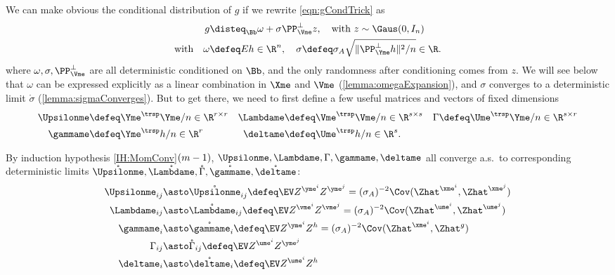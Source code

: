\documentclass[main.tex]{subfiles}
\begin{document}
We can make obvious the conditional distribution of $g$ if we rewrite \cref{eqn:gCondTrick} as
\begin{align}
  g &\disteq_\Bb \omega + \sigma \PP_{\Vme}^\perp z,\quad \text{with $z \sim \Gaus(0, I_n)$}
  \label{eqn:gConditionedOnB}
  \\
  \text{with}\quad
  \omega
  &\defeq
      E h \in \R^n,
      \quad
  \sigma \defeq
    \sigma_A
  \sqrt{\|\PP_{\Yme}^\perp h\|^2/n} \in \R
  .
  \label{eqn:meanvardef}
\end{align}
where $\omega, \sigma, \PP_\Vme^\perp$ are all deterministic conditioned on $\Bb$, and the only randomness after conditioning comes from $z$.
We will see below that $\omega$ can be expressed explicitly as a linear combination in $\Xme$ and $\Vme$ (\cref{lemma:omegaExpansion}), and $\sigma$ converges to a deterministic limit $\mathring\sigma$ (\cref{lemma:sigmaConverges}).
But to get there, we need to first define a few useful matrices and vectors of fixed dimensions
\begin{equation}
\begin{aligned}
    \Upsilonme 
        &\defeq
            \Yme^\trsp \Yme/n \in \R^{r \times r}
            &
    \Lambdame 
        &\defeq
            \Vme^\trsp \Vme/n \in \R^{s \times s}
            &
    \Gamma
        &\defeq
            \Ume^\trsp \Yme/n \in \R^{s \times r}
            \\
    \gammame
        &\defeq
            \Yme^\trsp h/n \in \R^{r}
            &
    \deltame
        &\defeq
            \Ume^\trsp h /n \in \R^s
            .
\end{aligned}
    \label{eqn:momentMatrices}
\end{equation}

By induction hypothesis \ref{IH:MomConv}$(m-1)$, $\Upsilonme , \Lambdame , \Gamma, \gammame, \deltame$ all converge a.s.\ to corresponding deterministic limits $\mathring{\Upsilonme }, \mathring{\Lambdame }, \mathring \Gamma, \mathring{\gammame}, \mathring{\deltame}$:
\begin{equation}
\begin{aligned}
  \Upsilonme_{ij}
    &\asto
      \mathring{\Upsilonme }_{ij}
    \defeq
      \EV  Z^{\yme^i}  Z^{\yme^j}
    =
      (\sigma_A)^{-2} 
      \Cov(\Zhat^{\xme^i}, \Zhat^{\xme^j})
      \\
    \Lambdame_{ij}
      &\asto
        \mathring{\Lambdame }_{ij}
      \defeq
        \EV  Z^{\vme^i}  Z^{\vme^j}
      =
        (\sigma_A)^{-2} \Cov(\Zhat^{\ume^{i}}, \Zhat^{\ume^{j}})
      \\
  \gammame_i
    &\asto
      \mathring{\gammame}_i
    \defeq
      \EV  Z^{\yme^i} Z^h
    =
      (\sigma_A)^{-2} \Cov(\Zhat^{\xme^i}, \Zhat^{g})
      \\
  \Gamma_{ij}
    &\asto
      \mathring \Gamma_{ij}
    \defeq
      \EV  Z^{\ume^i} Z^{\yme^j}
      \\
  \deltame_i
    &\asto
      \mathring{\deltame}_i
    \defeq
      \EV  Z^{\ume^i} Z^h
\end{aligned}
\label{eqn:limitMatrices}
\end{equation}
\end{document}
